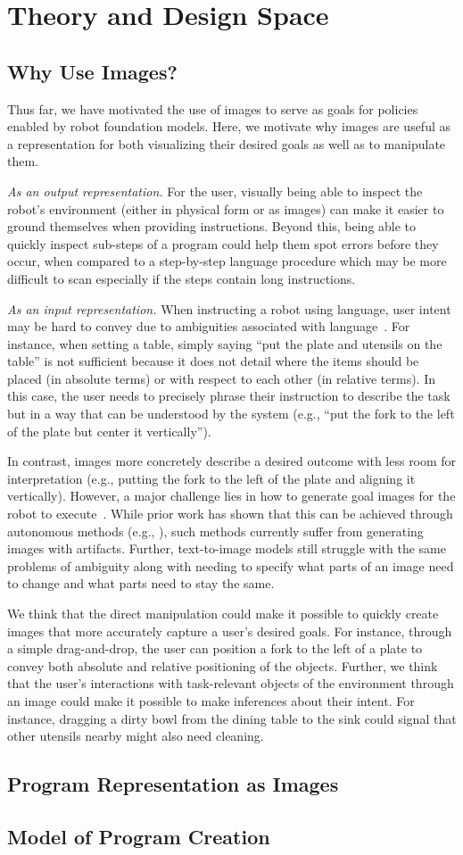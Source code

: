 \section{Theory and Design Space}
\subsection{Why Use Images?}
Thus far, we have motivated the use of images to serve as goals for policies enabled by robot foundation models. Here, we motivate why images are useful as a representation for both visualizing their desired goals as well as to manipulate them.

\emph{As an output representation.} For the user, visually being able to inspect the robot's environment (either in physical form or as images) can make it easier to ground themselves when providing instructions. Beyond this, being able to quickly inspect sub-steps of a program could help them spot errors before they occur, when compared to a step-by-step language procedure which may be more difficult to scan especially if the steps contain long instructions.

\emph{As an input representation.} When instructing a robot using language, user intent may be hard to convey due to ambiguities associated with language~\cite{masson2024directgpt, sundaresan2024rt}. For instance, when setting a table, simply saying ``put the plate and utensils on the table'' is not sufficient because it does not detail where the items should be placed (in absolute terms) or with respect to each other (in relative terms). In this case, the user needs to precisely phrase their instruction to describe the task but in a way that can be understood by the system (e.g., ``put the fork to the left of the plate but center it vertically''). 

In contrast, images more concretely describe a desired outcome with less room for interpretation (e.g., putting the fork to the left of the plate and aligning it vertically). However, a major challenge lies in how to generate goal images for the robot to execute~\cite{sundaresan2024rt}. While prior work has shown that this can be achieved through autonomous methods (e.g., \cite{black2023zero}), such methods currently suffer from generating images with artifacts. Further, text-to-image models still struggle with the same problems of ambiguity along with needing to specify what parts of an image need to change and what parts need to stay the same. 

We think that the direct manipulation could make it possible to quickly create images that more accurately capture a user's desired goals. For instance, through a simple drag-and-drop, the user can position a fork to the left of a plate to convey both absolute and relative positioning of the objects. Further, we think that the user's interactions with task-relevant objects of the environment through an image could make it possible to make inferences about their intent. For instance, dragging a dirty bowl from the dining table to the sink could signal that other utensils nearby might also need cleaning.

\subsection{Program Representation as Images}

\subsection{Model of Program Creation}

